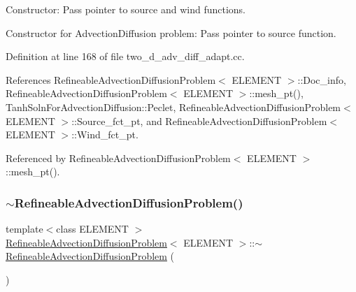 Constructor\+: Pass pointer to source and wind functions. 

Constructor for Advection\+Diffusion problem\+: Pass pointer to source function. 

Definition at line 168 of file two\+\_\+d\+\_\+adv\+\_\+diff\+\_\+adapt.\+cc.



References Refineable\+Advection\+Diffusion\+Problem$<$ E\+L\+E\+M\+E\+N\+T $>$\+::\+Doc\+\_\+info, Refineable\+Advection\+Diffusion\+Problem$<$ E\+L\+E\+M\+E\+N\+T $>$\+::mesh\+\_\+pt(), Tanh\+Soln\+For\+Advection\+Diffusion\+::\+Peclet, Refineable\+Advection\+Diffusion\+Problem$<$ E\+L\+E\+M\+E\+N\+T $>$\+::\+Source\+\_\+fct\+\_\+pt, and Refineable\+Advection\+Diffusion\+Problem$<$ E\+L\+E\+M\+E\+N\+T $>$\+::\+Wind\+\_\+fct\+\_\+pt.



Referenced by Refineable\+Advection\+Diffusion\+Problem$<$ E\+L\+E\+M\+E\+N\+T $>$\+::mesh\+\_\+pt().

\mbox{\label{classRefineableAdvectionDiffusionProblem_ae746646f6c255dca13e5abe9fcf85fe3}} 
\subsubsection{\texorpdfstring{$\sim$\+Refineable\+Advection\+Diffusion\+Problem()}{~RefineableAdvectionDiffusionProblem()}\hspace{0.1cm}{\footnotesize\ttfamily [1/2]}}
{\footnotesize\ttfamily template$<$class E\+L\+E\+M\+E\+NT $>$ \\
\hyperlink{classRefineableAdvectionDiffusionProblem}{Refineable\+Advection\+Diffusion\+Problem}$<$ E\+L\+E\+M\+E\+NT $>$\+::$\sim$\hyperlink{classRefineableAdvectionDiffusionProblem}{Refineable\+Advection\+Diffusion\+Problem} (\begin{DoxyParamCaption}{ }\end{DoxyParamCaption})\hspace{0.3cm}{\ttfamily [inline]}}



